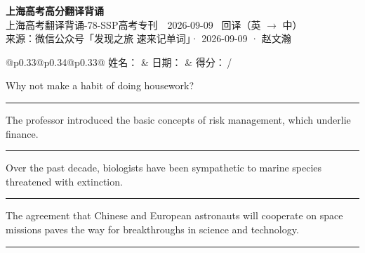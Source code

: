 \documentclass[11pt,a4paper]{article}
\newcommand{\num}[1]{\makebox[1.9em][r]{#1.}\hspace{0.3em}}
\newcommand{\wline}{\noindent\rule{\linewidth}{0.4pt}}
\begin{document}
\pagestyle{plain}
\begin{center}
{\LARGE\bfseries 上海高考高分翻译背诵 }\\[0.25em]
{\large 上海高考翻译背诵-78-SSP高考专刊　2026-09-09 \quad\ 回译（英 $\to$ 中）}\\[0.35em]
{\footnotesize 来源：微信公众号「发现之旅 速来记单词」· 2026-09-09 · 赵文瀚}
\end{center}

\vspace{0.4em}
\noindent\begin{tabular}{@{}p{0.33\textwidth}@{}p{0.34\textwidth}@{}p{0.33\textwidth}@{}}
姓名：\underline{\hspace{2.0cm}} & 日期：\underline{\hspace{2.0cm}} & 得分：\underline{\hspace{1.4cm}}\,/ \\
\end{tabular}

\vspace{0.5em}

\vspace{0.8em}
\num{1}Why not make a habit of doing housework?

\vspace{0.25em}

\wline

\num{2}The professor introduced the basic concepts of risk management, which underlie finance.

\vspace{0.25em}

\wline

\num{3}Over the past decade, biologists have been sympathetic to marine species threatened with extinction.

\vspace{0.25em}

\wline

\num{4}The agreement that Chinese and European astronauts will cooperate on space missions paves the way for breakthroughs in science and technology.

\vspace{0.25em}

\wline
\end{document}
